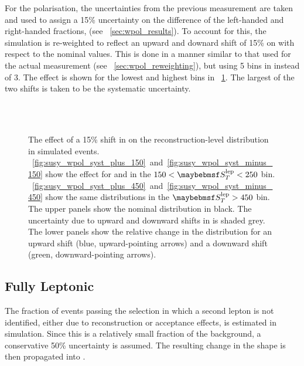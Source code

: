 For the \PW polarisation, the uncertainties from the previous measurement are taken and
used to assign a 15\% uncertainty on the difference of the left-handed and
right-handed fractions, \fLmfR (see \sec~\ref{sec:wpol_results}). To account for
this, the simulation is re-weighted to reflect an upward and downard shift of
15\% on \fLmfR with respect to the nominal values. This is done in a manner
similar to that used for the actual measurement (see
\sec~\ref{sec:wpol_reweighting}), but using 5 bins in \PtW instead of 3. The
effect is shown for the lowest and highest \STlep bins in
\fig~\ref{fig:susy_wpol_syst}. The largest of the two shifts is taken to be the
systematic uncertainty.

\begin{figure}
\centering
{}
\\
\\
\caption[Effect of a 15\% shift in \fLmfR on the electron \LP distribution]{The effect of a 15\% shift in \fLmfR on
  the reconstruction-level \LP distribution in simulated \Wenu
  events. \figs~\ref{fig:susy_wpol_syst_plus_150}~and~\ref{fig:susy_wpol_syst_minus_150}
  show the effect for \APelectron and \Pelectron in the $150 < \STlep < 250$
  bin. \figs~\ref{fig:susy_wpol_syst_plus_450}~and~\ref{fig:susy_wpol_syst_minus_450}
  show the same distributions in the $\STlep > 450$ bin. The upper panels show
  the nominal \LP distribution in black. The uncertainty due to upward and downward
  shifts in \fLmfR is shaded grey. The lower panels show the relative change
  in the distribution for an upward shift (blue, upward-pointing arrows) and a
  downward shift (green, downward-pointing arrows).}
\label{fig:susy_wpol_syst}
\end{figure}

\subsection[Fully Leptonic \texorpdfstring{\ttbar}{tt}]{Fully Leptonic \ttbar}
The fraction of events passing the selection in which a second lepton is not
identified, either due to reconstruction or acceptance effects, is estimated in
simulation. Since this is a relatively small fraction of the background, a
conservative 50\% uncertainty is assumed. The resulting change in the \LP shape
is then propagated into \RCS.

